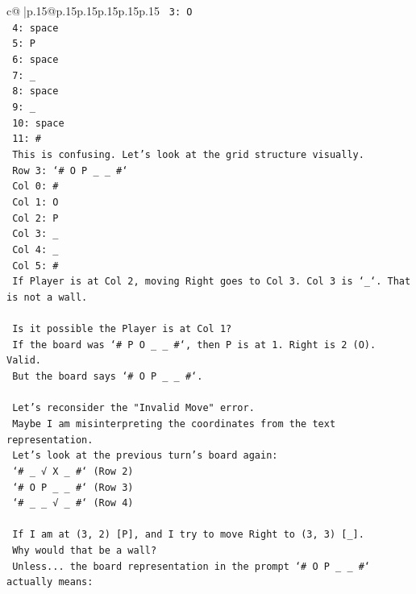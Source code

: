 \documentclass{article}
\begin{document}
{\begin{supertabular}{c@{$\;$}|p{.15\linewidth}@{}p{.15\linewidth}p{.15\linewidth}p{.15\linewidth}p{.15\linewidth}p{.15\linewidth}}
{{{\texttt{    3: O} \\
\texttt{    4: space} \\
\texttt{    5: P} \\
\texttt{    6: space} \\
\texttt{    7: \_} \\
\texttt{    8: space} \\
\texttt{    9: \_} \\
\texttt{    10: space} \\
\texttt{    11: \#} \\
\texttt{    This is confusing. Let's look at the grid structure visually.} \\
\texttt{    Row 3: `\# O P \_ \_ \#`} \\
\texttt{    Col 0: \#} \\
\texttt{    Col 1: O} \\
\texttt{    Col 2: P} \\
\texttt{    Col 3: \_} \\
\texttt{    Col 4: \_} \\
\texttt{    Col 5: \#} \\
\texttt{    If Player is at Col 2, moving Right goes to Col 3. Col 3 is `\_`. That is not a wall.} \\
\\ 
\texttt{    Is it possible the Player is at Col 1?} \\
\texttt{    If the board was `\# P O \_ \_ \#`, then P is at 1. Right is 2 (O). Valid.} \\
\texttt{    But the board says `\# O P \_ \_ \#`.} \\
\\ 
\texttt{    Let's reconsider the "Invalid Move" error.} \\
\texttt{    Maybe I am misinterpreting the coordinates from the text representation.} \\
\texttt{    Let's look at the previous turn's board again:} \\
\texttt{    `\# \_ √ X \_ \#` (Row 2)} \\
\texttt{    `\# O P \_ \_ \#` (Row 3)} \\
\texttt{    `\# \_ \_ √ \_ \#` (Row 4)} \\
\\ 
\texttt{    If I am at (3, 2) {[}P{]}, and I try to move Right to (3, 3) {[}\_{]}.} \\
\texttt{    Why would that be a wall?} \\
\texttt{    Unless... the board representation in the prompt `\# O P \_ \_ \#` actually means:} \\
}}}
\end{supertabular}}
\end{document}

